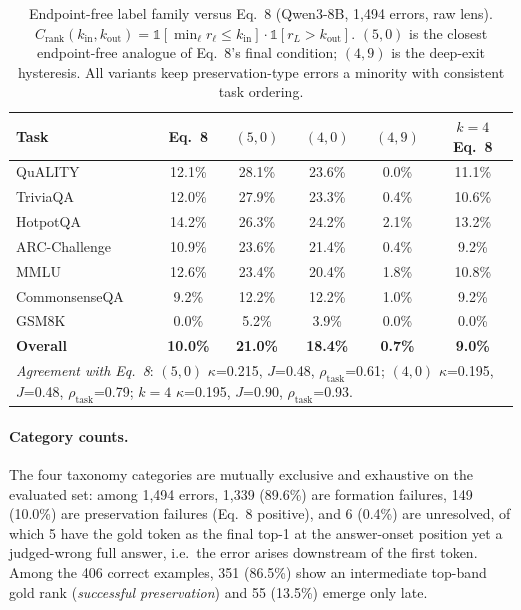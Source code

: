 \documentclass{article} %
\begin{document}
\begin{table}[t]
\centering
\caption{Endpoint-free label family versus Eq.~8 (Qwen3-8B, 1{,}494 errors, raw lens). $C_{\mathrm{rank}}(k_{\mathrm{in}},k_{\mathrm{out}})=\mathbb{1}[\min_\ell r_\ell\le k_{\mathrm{in}}]\cdot\mathbb{1}[r_L>k_{\mathrm{out}}]$. $(5,0)$ is the closest endpoint-free analogue of Eq.~8's final condition; $(4,9)$ is the deep-exit hysteresis. All variants keep preservation-type errors a minority with consistent task ordering.}
\label{tab:endpointfree}
\small
\begin{tabular}{lccccc}
\toprule
\textbf{Task} & \textbf{Eq.~8} & \textbf{$(5,0)$} & \textbf{$(4,0)$} & \textbf{$(4,9)$} & \textbf{$k{=}4$ Eq.~8} \\
\midrule
QuALITY & 12.1\% & 28.1\% & 23.6\% & 0.0\% & 11.1\% \\
TriviaQA & 12.0\% & 27.9\% & 23.3\% & 0.4\% & 10.6\% \\
HotpotQA & 14.2\% & 26.3\% & 24.2\% & 2.1\% & 13.2\% \\
ARC-Challenge & 10.9\% & 23.6\% & 21.4\% & 0.4\% & 9.2\% \\
MMLU & 12.6\% & 23.4\% & 20.4\% & 1.8\% & 10.8\% \\
CommonsenseQA & 9.2\% & 12.2\% & 12.2\% & 1.0\% & 9.2\% \\
GSM8K & 0.0\% & 5.2\% & 3.9\% & 0.0\% & 0.0\% \\
\midrule
\textbf{Overall} & \textbf{10.0\%} & \textbf{21.0\%} & \textbf{18.4\%} & \textbf{0.7\%} & \textbf{9.0\%} \\
\midrule
\multicolumn{6}{l}{\emph{Agreement with Eq.~8}: $(5,0)$ $\kappa$=0.215, $J$=0.48, $\rho_{\mathrm{task}}$=0.61; $(4,0)$ $\kappa$=0.195, $J$=0.48, $\rho_{\mathrm{task}}$=0.79; $k{=}4$ $\kappa$=0.195, $J$=0.90, $\rho_{\mathrm{task}}$=0.93.} \\
\bottomrule
\end{tabular}
\end{table}

\paragraph{Category counts.}
The four taxonomy categories are mutually exclusive and exhaustive on the evaluated set: among 1{,}494 errors, 1{,}339 (89.6\%) are formation failures, 149 (10.0\%) are preservation failures (Eq.~8 positive), and 6 (0.4\%) are unresolved, of which 5 have the gold token as the final top-1 at the answer-onset position yet a judged-wrong full answer, i.e.\ the error arises downstream of the first token. Among the 406 correct examples, 351 (86.5\%) show an intermediate top-band gold rank (\emph{successful preservation}) and 55 (13.5\%) emerge only late.
\end{document}
